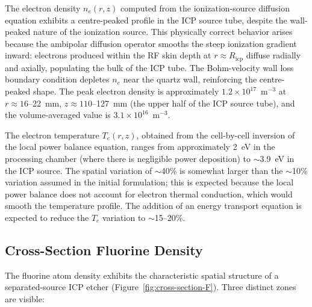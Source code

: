 \documentclass[11pt,a4paper]{report}
\newcommand{\Te}{T_e}
\begin{document}
The electron density $n_e(r,z)$ computed from the ionization-source diffusion equation exhibits a centre-peaked profile in the ICP source tube, despite the wall-peaked nature of the ionization source.  This physically correct behavior arises because the ambipolar diffusion operator smooths the steep ionization gradient inward: electrons produced within the RF skin depth at $r \approx R_\mathrm{icp}$ diffuse radially and axially, populating the bulk of the ICP tube.  The Bohm-velocity wall loss boundary condition depletes $n_e$ near the quartz wall, reinforcing the centre-peaked shape.  The peak electron density is approximately $1.2 \times 10^{17}$~m$^{-3}$ at $r \approx 16$--\SI{22}{\milli\meter}, $z \approx 110$--\SI{127}{\milli\meter} (the upper half of the ICP source tube), and the volume-averaged value is $3.1 \times 10^{16}$~m$^{-3}$.

The electron temperature $\Te(r,z)$, obtained from the cell-by-cell inversion of the local power balance equation, ranges from approximately 2~eV in the processing chamber (where there is negligible power deposition) to $\sim$\SI{3.9}{\electronvolt} in the ICP source.  The spatial variation of $\sim$40\% is somewhat larger than the $\sim$10\% variation assumed in the initial formulation; this is expected because the local power balance does not account for electron thermal conduction, which would smooth the temperature profile.  The addition of an energy transport equation is expected to reduce the $\Te$ variation to $\sim$15--20\%.

\subsection{Cross-Section Fluorine Density}

The fluorine atom density exhibits the characteristic spatial structure of a separated-source ICP etcher (Figure~\ref{fig:cross-section-F}).  Three distinct zones are visible:
\end{document}
